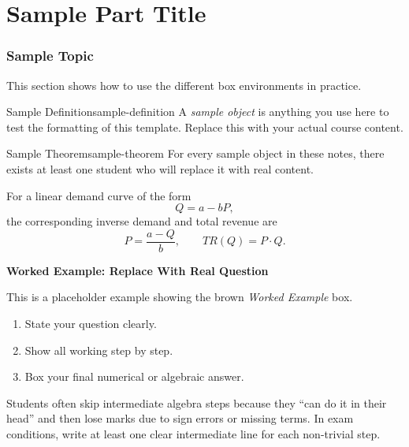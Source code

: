 \documentclass[12pt]{article}
\begin{document}
\newpage
\part{Sample Part Title}

\section{Sample Topic}

This section shows how to use the different box environments in practice.

\begin{definition}{Sample Definition}{sample-definition}
A \emph{sample object} is anything you use here to test the formatting of this template. Replace this with your actual course content.
\end{definition}

\begin{theorem}{Sample Theorem}{sample-theorem}
For every sample object in these notes, there exists at least one student who will replace it with real content.
\end{theorem}

\begin{keyformula}
For a linear demand curve of the form
\[
Q = a - bP,
\]
the corresponding inverse demand and total revenue are
\[
P = \frac{a - Q}{b}, \qquad TR(Q) = P \cdot Q.
\]
\end{keyformula}

\begin{examplebox}
\textbf{Worked Example: Replace With Real Question}

This is a placeholder example showing the brown \emph{Worked Example} box.

\begin{enumerate}
    \item State your question clearly.
    \item Show all working step by step.
    \item Box your final numerical or algebraic answer.
\end{enumerate}
\end{examplebox}

\begin{commonmistake}
Students often skip intermediate algebra steps because they ``can do it in their head'' and then lose marks due to sign errors or missing terms. In exam conditions, write at least one clear intermediate line for each non-trivial step.
\end{commonmistake}
\end{document}
